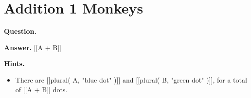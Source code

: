 \documentclass{article}
\begin{document}
\section*{Addition 1 Monkeys}
\textbf{Question.} 

\textbf{Answer.} [[A + B]]

\textbf{Hints.}
\begin{itemize}
  \item There are [[plural( A, "blue dot" )]] and [[plural( B, "green dot" )]], for a total of [[A + B]] dots.
\end{itemize}
\end{document}
